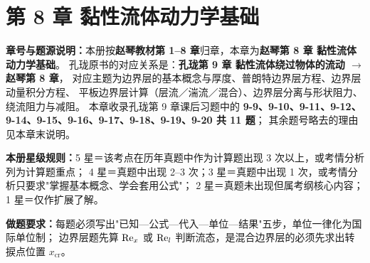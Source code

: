 \chapter*{第 8 章 黏性流体动力学基础}

\begin{tishi}
\textbf{章号与题源说明：}本册按\textbf{赵琴教材第 1--8 章}归章，本章为\textbf{赵琴第 8 章 黏性流体动力学基础}。
孔珑原书的对应关系是：\textbf{孔珑第 9 章 黏性流体绕过物体的流动 $\to$ 赵琴第 8 章}，
对应主题为边界层的基本概念与厚度、普朗特边界层方程、边界层动量积分方程、
平板边界层计算（层流／湍流／混合）、边界层分离与形状阻力、绕流阻力与减阻。
本章收录孔珑第 9 章课后习题中的
\textbf{9-9、9-10、9-11、9-12、9-14、9-15、9-16、9-17、9-18、9-19、9-20 共 11 题}；
其余题号略去的理由见本章末说明。

\textbf{本册星级规则：}5 星＝该考点在历年真题中作为计算题出现 3 次以上，或考情分析列为计算题重点；
4 星＝真题中出现 2--3 次；3 星＝真题中出现 1 次，或考情分析只要求"掌握基本概念、学会套用公式"；
2 星＝真题未出现但属考纲核心内容；1 星＝仅作扩展了解。

\textbf{做题要求：}每题必须写出"已知—公式—代入—单位—结果"五步，单位一律化为国际单位制；
边界层题先算 $\mathrm{Re}_x$ 或 $\mathrm{Re}_l$ 判断流态，是混合边界层的必须先求出转捩点位置 $x_{\mathrm{cr}}$。
\end{tishi}

